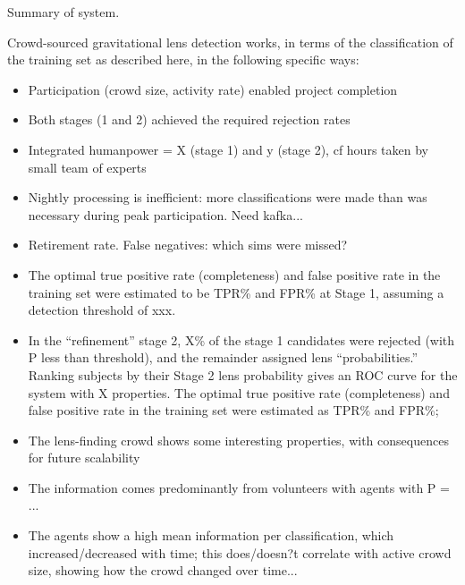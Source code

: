 \documentclass[useAMS,usenatbib,a4paper]{mn2e}
\begin{document}
Summary of system.

Crowd-sourced gravitational lens detection works, in terms of the
classification of the training set as described here, in the following
specific ways: 

\begin{itemize} 

\item Participation (crowd size, activity rate) enabled project completion

\item Both stages (1 and 2) achieved the required rejection rates

\item Integrated humanpower = X (stage 1) and y (stage 2), cf hours taken by
small team of experts 

\item Nightly processing is inefficient: more classifications were made than
was necessary during peak participation. Need kafka...

\item Retirement rate. False negatives: which sims were missed?

\item The optimal true positive rate (completeness) and false positive rate in
the training set were estimated to be TPR\% and FPR\% at Stage 1, assuming a
detection threshold of xxx.  

\item In the ``refinement'' stage 2, X\% of the stage 1 candidates were
rejected (with P less than threshold), and the remainder assigned lens
``probabilities.'' Ranking
subjects by their Stage 2 lens probability gives an ROC curve for the system
with X properties. The optimal true positive rate (completeness) and false
positive rate in the training set were estimated as TPR\% and FPR\%; 

\item The lens-finding crowd shows some interesting properties, with
consequences for future scalability

\item The information comes predominantly from volunteers with agents with P =
...

\item The agents show a high mean information per classification, which
increased/decreased with time; this does/doesn?t correlate with active crowd
size, showing how the crowd changed over time...

\end{itemize}
\end{document}
